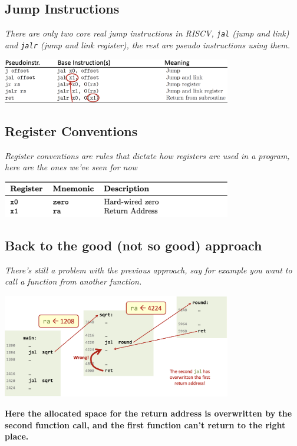 \subsection{Jump Instructions}
\textit{There are only two core real jump instructions in RISCV, \texttt{jal} (jump and link) and \texttt{jalr} (jump and link register), the rest are pseudo instructions using them.} \\

\begin{center}
    \includegraphics[width=0.75\textwidth]{chapters/chapter1b/images/jump.png}
\end{center}
\newpage
\subsection{Register Conventions}
\textit{Register conventions are rules that dictate how registers are used in a program, here are the ones we've seen for now} \\
\begin{center}
    \includegraphics[width=0.75\textwidth]{chapters/chapter1b/images/conventions.png}
\end{center}

\subsection{Back to the good (not so good) approach}
\textit{There's still a problem with the previous approach, say for example you want to call a function from another function.}
\begin{center}
    \includegraphics[width=0.75\textwidth]{chapters/chapter1b/images/function2.png}
\end{center}
\textbf{Here the allocated space for the return address is overwritten by the second function call, and the first function can't return to the right place.}
